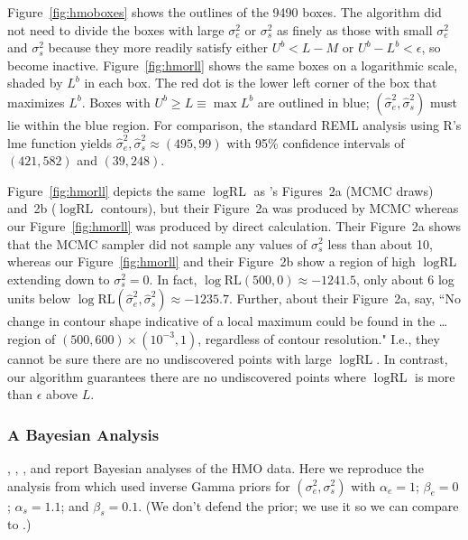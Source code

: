 \documentclass[ejs]{imsart}
\newcommand{\textcompute}{\textsf}
\newcommand{\R}{\textcompute{R}\xspace}
\newcommand{\RLorig}{\text{RL}}
\newcommand{\logRLorig}{\log\RLorig}
\newcommand{\sigssq}{\sigma_s^2}
\newcommand{\sigesq}{\sigma_e^2}
\newcommand{\sshat}{\hat\sigma^2_e,\hat\sigma^2_s}
\begin{document}
Figure~\ref{fig:hmoboxes} shows the outlines of the 9490 boxes.  The algorithm did not need to divide the boxes with large $\sigesq$ or $\sigssq$ as finely as those with small $\sigesq$ and $\sigssq$ because they more readily satisfy either $U^b < L-M$ or $U^b - L^b < \epsilon$, so become inactive.  Figure~\ref{fig:hmorll} shows the same boxes on a logarithmic scale, shaded by $L^b$ in each box.  The red dot is the lower left corner of the box that maximizes $L^b$.  Boxes with $U^b \ge L \equiv \max L^b$ are outlined in blue; $(\sshat)$ must lie within the blue region.  
For comparison, the standard REML analysis using \R's \textcompute{lme} function yields $\sshat \approx (495, 99)$ with 95\% confidence intervals of $(421, 582)$ and $(39, 248)$.

Figure~\ref{fig:hmorll} depicts the same $\logRLorig$ as \cite{henn&hodges:2014}'s Figures~2a (MCMC draws) and~2b ($\logRLorig$ contours), but their Figure~2a was produced by MCMC whereas our Figure~\ref{fig:hmorll} was produced by direct calculation.  Their Figure~2a shows that the MCMC sampler did not sample any values of $\sigssq$ less than about 10, whereas our Figure~\ref{fig:hmorll} and their Figure~2b show a region of high $\logRLorig$ extending down to $\sigssq=0$.  In fact, $\logRLorig(500,0) \approx -1241.5$, only about 6 log units below $\logRLorig(\sshat) \approx -1235.7$.  Further, about their Figure~2a, \cite{henn&hodges:2014} say, ``No change in contour shape indicative of a local maximum could be found in the \dots region of $(500, 600) \times (10^{-3}, 1)$, regardless of contour resolution."  I.e., they cannot be sure there are no undiscovered points with large $\logRLorig$.  In contrast, our algorithm guarantees there are no undiscovered points where $\logRLorig$ is more than $\epsilon$ above $L$.

\subsubsection{A Bayesian Analysis}
 \cite{hodges:98}, \cite{wakefield:1998}, \cite{hodges:2013}, and \cite{henn&hodges:2014} report  Bayesian analyses of the HMO data.  Here we reproduce the analysis from \cite{hodges:98} which used inverse Gamma priors for $(\sigesq,\sigssq)$ with $\alpha_e = 1$; $\beta_e = 0$; $\alpha_s = 1.1$; and $\beta_s =0.1$.  (We don't defend the prior; we use it so we can compare to \cite{hodges:98}.)
\end{document}
